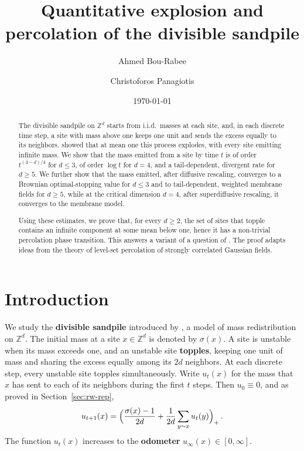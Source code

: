 \documentclass[11pt]{amsart}
\title{Quantitative explosion and percolation of the divisible sandpile}
\author{Ahmed Bou-Rabee}
\author{Christoforos Panagiotis}
\date{\today}
\theoremstyle{plain}
\theoremstyle{definition}
\newcommand{\Z}{\mathbb{Z}}
\begin{document}
\begin{abstract}
The divisible sandpile on $\Z^d$ starts from i.i.d.\ masses at each site, and, in each discrete time step, a site with mass above one keeps one unit and sends the excess equally to its neighbors. \citet*{LMPU} showed that at mean one this process explodes, with every site emitting infinite mass. We show 
that the mass emitted from a site by time $t$ is of order $t^{(4-d)/4}$ for $d\leq3$, of order $\log t$ for $d=4$, and a tail-dependent, divergent rate for $d\geq5$. We further show that the mass emitted, after diffusive rescaling, converges to a Brownian optimal-stopping value for $d\leq3$ and to tail-dependent, weighted membrane fields for $d\geq5$, while at the critical dimension $d=4$, after superdiffusive rescaling, it converges to the membrane model.

Using these estimates, we prove that, for every $d\geq2$, the set of sites that topple contains an infinite component at some mean below one, hence it has a non-trivial percolation phase transition. This answers a variant of a question of \citet*{FMR}. The proof adapts ideas from the theory of level-set percolation of strongly correlated Gaussian fields.
\end{abstract}

\maketitle

{\small \tableofcontents}


\section{Introduction}\label{sec:intro}

We study the \textbf{divisible sandpile} introduced by \citet*{LevinePeres09}, a model of mass redistribution on $\Z^d$. The initial mass at a site $x \in \Z^d$ is denoted by $\sigma(x)$. A site is unstable when its mass exceeds one, and an unstable site \textbf{topples}, keeping one unit of mass and sharing the excess equally among its $2d$ neighbors. At each discrete step, every unstable site topples simultaneously. Write $u_t(x)$ for the mass that $x$ has sent to each of its neighbors during the first $t$ steps. Then $u_0\equiv0$, and as proved in Section~\ref{sec:rw-rep},
\begin{equation}\label{eq:intro-recursion}
    u_{t+1}(x)=\Bigl(\frac{\sigma(x)-1}{2d}+\frac{1}{2d}\sum_{y\sim x}u_t(y)\Bigr)_+\, .
\end{equation}
The function $u_t(x)$ increases to the \textbf{odometer} $u_\infty(x)\in[0,\infty]$.
\end{document}
